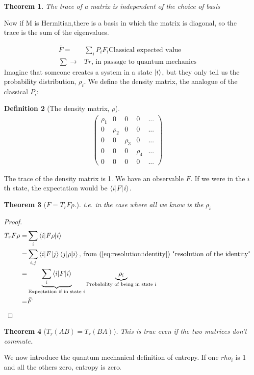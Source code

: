 \documentclass[]{article}
\newtheorem{thm}{Theorem}
\newtheorem{defn}[thm]{Definition}
\begin{document}
\begin{thm}The trace of a matrix is independent of the choice of basis
\end{thm}

Now if M is Hermitian,there is a basis in which the matrix is diagonal, so the trace is the sum of the eigenvalues.

\begin{align*}
	\bar{F} =& \sum_i P_i F_i \text{Classical expected value}\\
	\sum \rightarrow& Tr \text{, in passage to quantum mechanics}
\end{align*}
Imagine that someone creates a system in a state $\ket{i}$, but they only tell us the probability distribution, $\rho_i$. We define the density matrix, the analogue of the classical $P_i$:
\begin{defn}[The density matrix, $\rho$]
	\begin{align*}
		\begin{pmatrix}
			\rho_1&0&0&0&...\\
			0&\rho_2&0&0&...\\
			0&0&\rho_3&0&...\\
			0&0&0&\rho_4&...\\
			0&0&0&0&...
		\end{pmatrix}
	\end{align*}
\end{defn}
The trace of the density matrix is 1.
We have an observable $F$. If we were in the $i$th state, the expectation would be $\braket{i\vert F \vert i}$.
\begin{thm}[$\bar{F}= T_r F \rho$.]
	i.e. in the case where all we know is the $\rho_i$
\end{thm}
\begin{proof}
	\begin{align*}
		T_r F \rho=&\sum_i \braket{i \vert F \rho \vert i}\\
		=& \sum_{i,j} \braket{i \vert F \vert j} \braket{j \vert \rho \vert i} \text{, from (\ref{eq:resolution:identity}) "resolution of the identity"}\\
		=& \underbrace{\sum_i \braket{i \vert F \vert i}}_\text{Expectation if in state $i$} \underbrace{\rho_i}_\text{Probability of being in state i}\\
		=& \bar{F}
	\end{align*}
\end{proof}

\begin{thm}[$T_r(AB)=T_r(BA)$]This is true even if the two matrices don't commute.
\end{thm}
We now introduce the quantum mechanical definition of entropy. If one $rho_i$ is 1 and all the others zero, entropy is zero.
\end{document}
